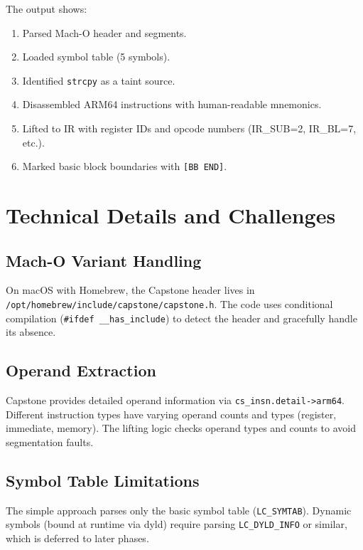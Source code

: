 \documentclass[12pt,a4paper]{article}
\begin{document}
The output shows:
\begin{enumerate}
  \item Parsed Mach-O header and segments.
  \item Loaded symbol table (5 symbols).
  \item Identified \texttt{strcpy} as a taint source.
  \item Disassembled ARM64 instructions with human-readable mnemonics.
  \item Lifted to IR with register IDs and opcode numbers (IR\_SUB=2, IR\_BL=7, etc.).
  \item Marked basic block boundaries with \texttt{[BB END]}.
\end{enumerate}

\newpage

\section{Technical Details and Challenges}

\subsection{Mach-O Variant Handling}

On macOS with Homebrew, the Capstone header lives in \texttt{/opt/homebrew/include/capstone/capstone.h}. The code uses conditional compilation (\texttt{\#ifdef \_\_has\_include}) to detect the header and gracefully handle its absence.

\subsection{Operand Extraction}

Capstone provides detailed operand information via \texttt{cs\_insn.detail->arm64}. Different instruction types have varying operand counts and types (register, immediate, memory). The lifting logic checks operand types and counts to avoid segmentation faults.

\subsection{Symbol Table Limitations}

The simple approach parses only the basic symbol table (\texttt{LC\_SYMTAB}). Dynamic symbols (bound at runtime via dyld) require parsing \texttt{LC\_DYLD\_INFO} or similar, which is deferred to later phases.
\end{document}
